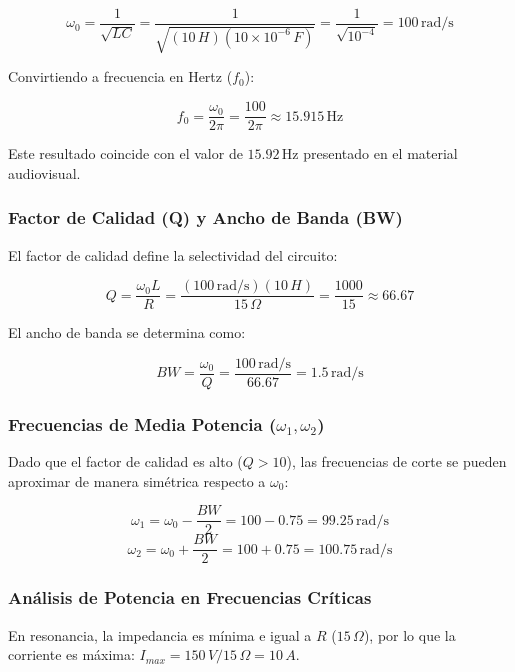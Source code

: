 \begin{equation}
	\omega_0 = \frac{1}{\sqrt{LC}} = \frac{1}{\sqrt{(10\,H)(10 \times 10^{-6}\,F)}} = \frac{1}{\sqrt{10^{-4}}} = 100\,\text{rad/s}
\end{equation}

Convirtiendo a frecuencia en Hertz ($f_0$):

\begin{equation}
	f_0 = \frac{\omega_0}{2\pi} = \frac{100}{2\pi} \approx 15.915\,\text{Hz}
\end{equation}

Este resultado coincide con el valor de $15.92\,\text{Hz}$ presentado en el material audiovisual.

\subsubsection{Factor de Calidad (Q) y Ancho de Banda (BW)}
El factor de calidad define la selectividad del circuito:

\begin{equation}
	Q = \frac{\omega_0 L}{R} = \frac{(100\,\text{rad/s})(10\,H)}{15\,\Omega} = \frac{1000}{15} \approx 66.67
\end{equation}

El ancho de banda se determina como:

\begin{equation}
	BW = \frac{\omega_0}{Q} = \frac{100\,\text{rad/s}}{66.67} = 1.5\,\text{rad/s}
\end{equation}

\subsubsection{Frecuencias de Media Potencia ($\omega_1, \omega_2$)}
Dado que el factor de calidad es alto ($Q > 10$), las frecuencias de corte se pueden aproximar de manera simétrica respecto a $\omega_0$:

\begin{equation}
	\omega_1 = \omega_0 - \frac{BW}{2} = 100 - 0.75 = 99.25\,\text{rad/s}
\end{equation}
\begin{equation}
	\omega_2 = \omega_0 + \frac{BW}{2} = 100 + 0.75 = 100.75\,\text{rad/s}
\end{equation}

\subsubsection{Análisis de Potencia en Frecuencias Críticas}
En resonancia, la impedancia es mínima e igual a $R$ ($15\,\Omega$), por lo que la corriente es máxima: $I_{max} = 150\,V / 15\,\Omega = 10\,A$.

